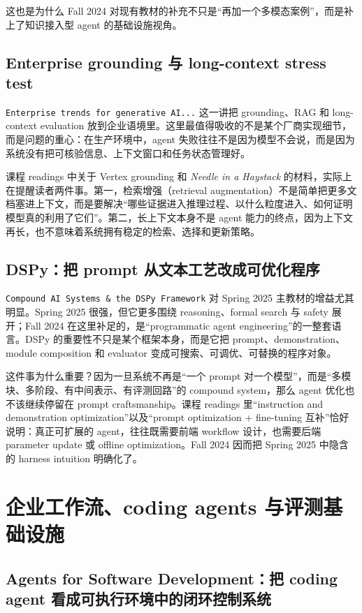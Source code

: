 这也是为什么 Fall 2024 对现有教材的补充不只是“再加一个多模态案例”，而是补上了知识接入型 agent 的基础设施视角。

\subsection{Enterprise grounding 与 long-context stress test}

\texttt{Enterprise trends for generative AI...} 这一讲把 grounding、RAG 和 long-context evaluation 放到企业语境里。这里最值得吸收的不是某个厂商实现细节，而是问题的重心：在生产环境中，agent 失败往往不是因为模型不会说，而是因为系统没有把可核验信息、上下文窗口和任务状态管理好。

课程 readings 中关于 Vertex grounding 和 \textit{Needle in a Haystack} 的材料，实际上在提醒读者两件事。第一，检索增强（retrieval augmentation）不是简单把更多文档塞进上下文，而是要解决“哪些证据进入推理过程、以什么粒度进入、如何证明模型真的利用了它们”。第二，长上下文本身不是 agent 能力的终点，因为上下文再长，也不意味着系统拥有稳定的检索、选择和更新策略。

\subsection{DSPy：把 prompt 从文本工艺改成可优化程序}

\texttt{Compound AI Systems \& the DSPy Framework} 对 Spring 2025 主教材的增益尤其明显。Spring 2025 很强，但它更多围绕 reasoning、formal search 与 safety 展开；Fall 2024 在这里补足的，是“programmatic agent engineering”的一整套语言。DSPy 的重要性不只是某个框架本身，而是它把 prompt、demonstration、module composition 和 evaluator 变成可搜索、可调优、可替换的程序对象。

这件事为什么重要？因为一旦系统不再是“一个 prompt 对一个模型”，而是“多模块、多阶段、有中间表示、有评测回路”的 compound system，那么 agent 优化也不该继续停留在 prompt craftsmanship。课程 readings 里“instruction and demonstration optimization”以及“prompt optimization + fine-tuning 互补”恰好说明：真正可扩展的 agent，往往既需要前端 workflow 设计，也需要后端 parameter update 或 offline optimization。Fall 2024 因而把 Spring 2025 中隐含的 harness intuition 明确化了。

\section{企业工作流、coding agents 与评测基础设施}

\subsection{Agents for Software Development：把 coding agent 看成可执行环境中的闭环控制系统}

